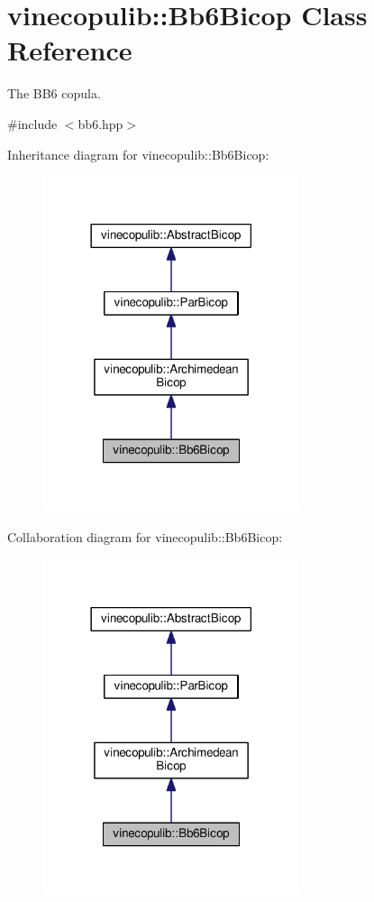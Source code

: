 \hypertarget{classvinecopulib_1_1_bb6_bicop}{}\section{vinecopulib\+:\+:Bb6\+Bicop Class Reference}
\label{classvinecopulib_1_1_bb6_bicop}


The B\+B6 copula.  




{\ttfamily \#include $<$bb6.\+hpp$>$}



Inheritance diagram for vinecopulib\+:\+:Bb6\+Bicop\+:
\nopagebreak
\begin{figure}[H]
\begin{center}
\leavevmode
\includegraphics[width=213pt]{classvinecopulib_1_1_bb6_bicop__inherit__graph}
\end{center}
\end{figure}


Collaboration diagram for vinecopulib\+:\+:Bb6\+Bicop\+:
\nopagebreak
\begin{figure}[H]
\begin{center}
\leavevmode
\includegraphics[width=213pt]{classvinecopulib_1_1_bb6_bicop__coll__graph}
\end{center}
\end{figure}
